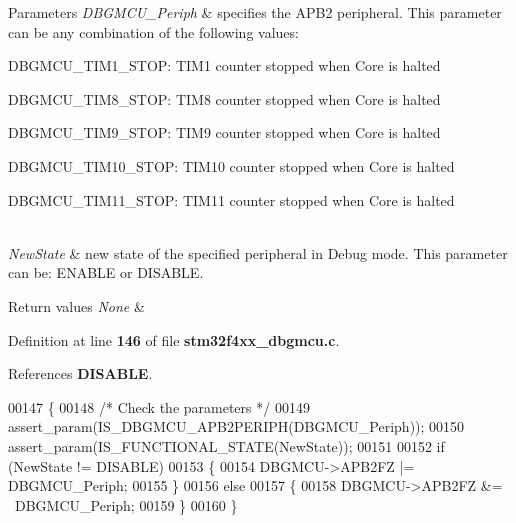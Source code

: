 \begin{DoxyParams}{Parameters}
{\em D\+B\+G\+M\+C\+U\+\_\+\+Periph} & specifies the A\+P\+B2 peripheral. This parameter can be any combination of the following values\+: \begin{DoxyItemize}
\item D\+B\+G\+M\+C\+U\+\_\+\+T\+I\+M1\+\_\+\+S\+T\+OP\+: T\+I\+M1 counter stopped when Core is halted \item D\+B\+G\+M\+C\+U\+\_\+\+T\+I\+M8\+\_\+\+S\+T\+OP\+: T\+I\+M8 counter stopped when Core is halted \item D\+B\+G\+M\+C\+U\+\_\+\+T\+I\+M9\+\_\+\+S\+T\+OP\+: T\+I\+M9 counter stopped when Core is halted \item D\+B\+G\+M\+C\+U\+\_\+\+T\+I\+M10\+\_\+\+S\+T\+OP\+: T\+I\+M10 counter stopped when Core is halted \item D\+B\+G\+M\+C\+U\+\_\+\+T\+I\+M11\+\_\+\+S\+T\+OP\+: T\+I\+M11 counter stopped when Core is halted \end{DoxyItemize}
\\
\hline
{\em New\+State} & new state of the specified peripheral in Debug mode. This parameter can be\+: E\+N\+A\+B\+LE or D\+I\+S\+A\+B\+LE. \\
\hline
\end{DoxyParams}

\begin{DoxyRetVals}{Return values}
{\em None} & \\
\hline
\end{DoxyRetVals}


Definition at line \textbf{ 146} of file \textbf{ stm32f4xx\+\_\+dbgmcu.\+c}.



References \textbf{ D\+I\+S\+A\+B\+LE}.


\begin{DoxyCode}
00147 \{
00148   \textcolor{comment}{/* Check the parameters */}
00149   assert_param(IS_DBGMCU_APB2PERIPH(DBGMCU\_Periph));
00150   assert_param(IS_FUNCTIONAL_STATE(NewState));
00151 
00152   \textcolor{keywordflow}{if} (NewState != DISABLE)
00153   \{
00154     DBGMCU->APB2FZ |= DBGMCU\_Periph;
00155   \}
00156   \textcolor{keywordflow}{else}
00157   \{
00158     DBGMCU->APB2FZ &= ~DBGMCU\_Periph;
00159   \}
00160 \}
\end{DoxyCode}
\mbox{\label{group__DBGMCU_gadf2f267f855ac1e4c03905c5dcfbd28b}} 
